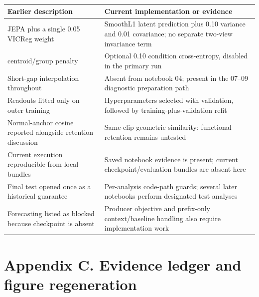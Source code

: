\documentclass[11pt,letterpaper]{article}
\newcounter{none}
\begin{document}
\begin{minipage}{\linewidth}

{\def\LTcaptype{none} %
\begin{longtable}[]{@{}
  >{\raggedright\arraybackslash}p{}
  >{\raggedright\arraybackslash}p{}@{}}
\toprule\noalign{}
\begin{minipage}[b]{\linewidth}\raggedright
Earlier description
\end{minipage} & \begin{minipage}[b]{\linewidth}\raggedright
Current implementation or evidence
\end{minipage} \\
\midrule\noalign{}
\endhead
\bottomrule\noalign{}
\endlastfoot
JEPA plus a single 0.05 VICReg weight & SmoothL1 latent prediction plus
0.10 variance and 0.01 covariance; no separate two-view invariance
term \\
0.25 centroid/group penalty & Optional 0.10 condition cross-entropy,
disabled in the primary run \\
Short-gap interpolation throughout & Absent from notebook 04; present in
the 07--09 diagnostic preparation path \\
Readouts fitted only on outer training & Hyperparameters selected with
validation, followed by training-plus-validation refit \\
Normal-anchor cosine reported alongside retention discussion & Same-clip
geometric similarity; functional retention remains untested \\
Current execution reproducible from local bundles & Saved notebook
evidence is present; current checkpoint/evaluation bundles are absent
here \\
Final test opened once as a historical guarantee & Per-analysis
code-path guards; several later notebooks perform designated test
analyses \\
Forecasting listed as blocked because checkpoint is absent & Producer
objective and prefix-only context/baseline handling also require
implementation work \\
\end{longtable}
}

\end{minipage}

\clearpage

\section{Appendix C. Evidence ledger and figure
regeneration}\label{appendix-c.-evidence-ledger-and-figure-regeneration}
\end{document}
